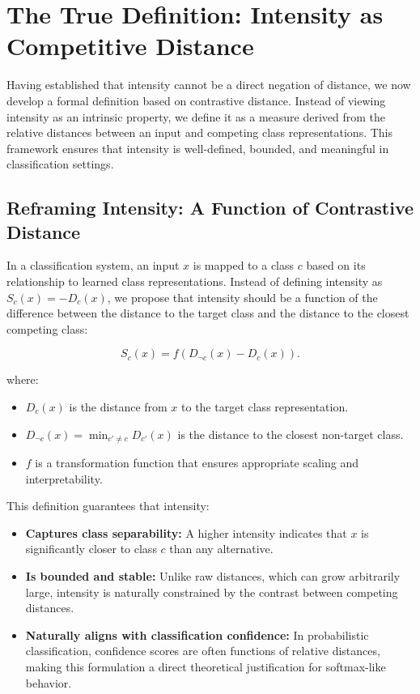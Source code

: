 \section{The True Definition: Intensity as Competitive Distance}

Having established that intensity cannot be a direct negation of distance, we now develop a formal definition based on contrastive distance. Instead of viewing intensity as an intrinsic property, we define it as a measure derived from the relative distances between an input and competing class representations. This framework ensures that intensity is well-defined, bounded, and meaningful in classification settings.

\subsection{Reframing Intensity: A Function of Contrastive Distance}

In a classification system, an input \( x \) is mapped to a class \( c \) based on its relationship to learned class representations. Instead of defining intensity as \( S_c(x) = -D_c(x) \), we propose that intensity should be a function of the difference between the distance to the target class and the distance to the closest competing class:

\[
S_c(x) = f(D_{\neg c}(x) - D_c(x)).
\]

where:

\begin{itemize}
    \item \( D_c(x) \) is the distance from \( x \) to the target class representation.
    \item \( D_{\neg c}(x) = \min_{c' \neq c} D_{c'}(x) \) is the distance to the closest non-target class.
    \item \( f \) is a transformation function that ensures appropriate scaling and interpretability.
\end{itemize}

This definition guarantees that intensity:

\begin{itemize}
    \item \textbf{Captures class separability:} A higher intensity indicates that \( x \) is significantly closer to class \( c \) than any alternative.
    \item \textbf{Is bounded and stable:} Unlike raw distances, which can grow arbitrarily large, intensity is naturally constrained by the contrast between competing distances.
    \item \textbf{Naturally aligns with classification confidence:} In probabilistic classification, confidence scores are often functions of relative distances, making this formulation a direct theoretical justification for softmax-like behavior.
\end{itemize}

